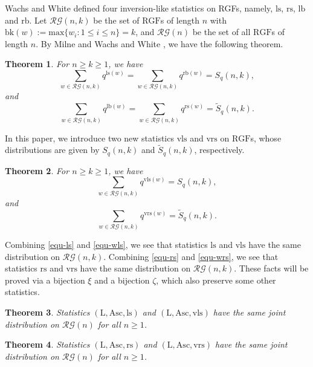 \documentclass[12pt]{amsart}
\numberwithin{equation}{section}
\theoremstyle{plain}
\newtheorem{theorem}{Theorem}[section]
\theoremstyle{definition}
\def\bk{\mathrm{bk}}
\def\RGF{\mathrm{RGF}}
\def\lb{\mathrm{lb}}
\def\ls{\mathrm{ls}}
\def\rb{\mathrm{rb}}
\def\rs{\mathrm{rs}}
\def\wrs{\mathrm{vrs}}
\def\wls{\mathrm{vls}}
\def\Asc{\mathrm{Asc}}
\def\LL{\mathrm{L}}
\def\max{\mathrm{max}}
\def\RG{\mathcal{RG}}
\begin{document}
Wachs and White \cite{WW} defined four inversion-like statistics on RGFs, namely, $\ls$, $\rs$, $\lb$ and $\rb$. Let $\RG(n,k)$ be the set of $\RGF$s of length $n$ with $\bk(w):=\max\{w_i:1\le i\le n\}=k$, and $\RG(n)$ be the set of all $\RGF$s of length $n$. By Milne\cite{Mi} and Wachs and White \cite{WW}, we have the following theorem.

\begin{theorem}\label{thm-WW}
For $n \geq k \geq 1$, we have
\begin{equation}\label{equ-ls}
  \sum_{w \in \RG(n,k)}q^{\ls(w)}=\sum_{w \in \RG(n,k)}q^{\rb(w)}=S_q(n,k),
\end{equation}
and
\begin{equation}\label{equ-rs}
  \sum_{w \in \RG(n,k)}q^{\lb(w)}=\sum_{w \in \RG(n,k)}q^{\rs(w)}=\widetilde{S}_q(n,k).
\end{equation}
\end{theorem}

In this paper, we introduce two new statistics $\wls$ and $\wrs$ on $\RGF$s, whose distributions are
given by $S_q(n,k)$ and $\widetilde{S}_q(n,k)$, respectively.



\begin{theorem} \label{main-rgf}
For $n \geq k \geq 1$, we have
\begin{equation}\label{equ-wls}
  \sum_{w \in \RG(n,k)}q^{\wls(w)}=S_q(n,k),
\end{equation}
and
\begin{equation}\label{equ-wrs}
  \sum_{w \in \RG(n,k)}q^{\wrs(w)}=\widetilde{S}_q(n,k).
\end{equation}
\end{theorem}

Combining \eqref{equ-ls} and \eqref{equ-wls}, we see that statistics
$\ls$ and $\wls$ have the same distribution on $\RG(n,k)$.
Combining \eqref{equ-rs} and \eqref{equ-wrs}, we see that statistics
$\rs$ and $\wrs$ have the same distribution on $\RG(n,k)$.
 These facts will be proved via a bijection $\xi$ and a bijection $\zeta$, which also preserve some other statistics.

\begin{theorem}\label{main-bijection}
Statistics $(\LL, \Asc, \ls)$ and
$(\LL, \Asc, \wls)$ have the same joint distribution on $\RG(n)$ for all $n \geq 1$.
\end{theorem}

\begin{theorem}\label{main-bijection-r}
Statistics $(\LL, \Asc, \rs)$ and
$(\LL, \Asc, \wrs)$ have the same joint distribution on $\RG(n)$ for all $n \geq  1$.
\end{theorem}
\end{document}
